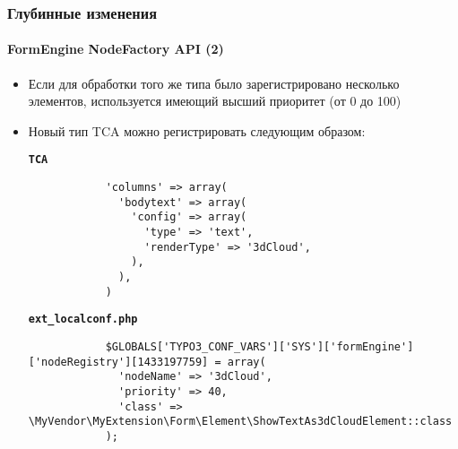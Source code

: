 \begin{frame}[fragile]
	\frametitle{Глубинные изменения}
	\framesubtitle{FormEngine NodeFactory API (2)}

	\lstset{basicstyle=\tiny\ttfamily}

	\begin{itemize}

		\item Если для обработки того же типа было зарегистрировано несколько элементов,
		используется имеющий высший приоритет (от 0 до 100)

		\item Новый тип TCA можно регистрировать следующим образом:

		\smaller\textbf{\texttt{TCA}}
		\begin{lstlisting}
			'columns' => array(
			  'bodytext' => array(
			    'config' => array(
			      'type' => 'text',
			      'renderType' => '3dCloud',
			    ),
			  ),
			)
		\end{lstlisting}

		\smaller\textbf{\texttt{ext\_localconf.php}}
		\begin{lstlisting}
			$GLOBALS['TYPO3_CONF_VARS']['SYS']['formEngine']['nodeRegistry'][1433197759] = array(
			  'nodeName' => '3dCloud',
			  'priority' => 40,
			  'class' => \MyVendor\MyExtension\Form\Element\ShowTextAs3dCloudElement::class
			);
		\end{lstlisting}

	\end{itemize}

\end{frame}


